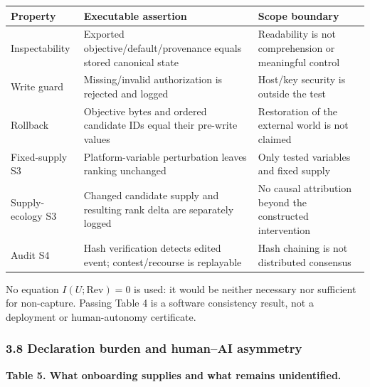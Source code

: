 \documentclass[
  11pt]{article}
\begin{document}
\begin{longtable}[]{@{}
  >{\raggedright\arraybackslash}p{}
  >{\raggedright\arraybackslash}p{}
  >{\raggedright\arraybackslash}p{}@{}}
\toprule\noalign{}
\begin{minipage}[b]{\linewidth}\raggedright
Property
\end{minipage} & \begin{minipage}[b]{\linewidth}\raggedright
Executable assertion
\end{minipage} & \begin{minipage}[b]{\linewidth}\raggedright
Scope boundary
\end{minipage} \\
\midrule\noalign{}
\endhead
\bottomrule\noalign{}
\endlastfoot
Inspectability & Exported objective/default/provenance equals stored
canonical state & Readability is not comprehension or meaningful
control \\
Write guard & Missing/invalid authorization is rejected and logged &
Host/key security is outside the test \\
Rollback & Objective bytes and ordered candidate IDs equal their
pre-write values & Restoration of the external world is not claimed \\
Fixed-supply S3 & Platform-variable perturbation leaves ranking
unchanged & Only tested variables and fixed supply \\
Supply-ecology S3 & Changed candidate supply and resulting rank delta
are separately logged & No causal attribution beyond the constructed
intervention \\
Audit S4 & Hash verification detects edited event; contest/recourse is
replayable & Hash chaining is not distributed consensus \\
\end{longtable}

No equation \(I(U;\mathrm{Rev})=0\) is used: it would be neither
necessary nor sufficient for non-capture. Passing Table 4 is a software
consistency result, not a deployment or human-autonomy certificate.

\subsubsection{3.8 Declaration burden and human--AI
asymmetry}\label{declaration-burden-and-humanai-asymmetry}

\textbf{Table 5. What onboarding supplies and what remains
unidentified.}
\end{document}
